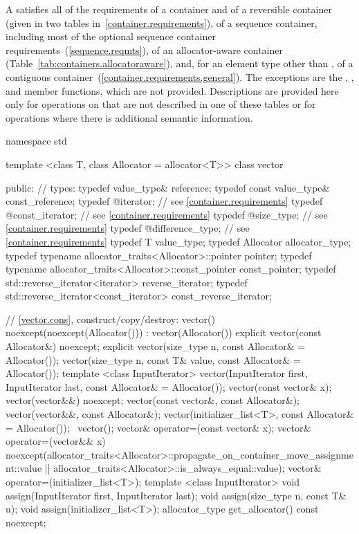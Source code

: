 \pnum
A  satisfies all of the requirements of a container and of a
reversible container (given in two tables in~\ref{container.requirements}), of a
sequence container, including most of the optional sequence container
requirements~(\ref{sequence.reqmts}), of an allocator-aware container
(Table~\ref{tab:containers.allocatoraware}),
and, for an element type other than ,
of a contiguous container~(\ref{container.requirements.general}).
The exceptions are the
, , and  member functions, which are not
provided. Descriptions are provided here only for operations on 
that are not described in one of these tables or for operations where there is
additional semantic information.

\begin{codeblock}
namespace std {
  template <class T, class Allocator = allocator<T>>
  class vector {
  public:
    // types:
    typedef value_type&                                         reference;
    typedef const value_type&                                   const_reference;
    typedef @\impdefnc@                              iterator;        // see \ref{container.requirements}
    typedef @\impdefnc@                              const_iterator;  // see \ref{container.requirements}
    typedef @\impdefnc@                              size_type;       // see \ref{container.requirements}
    typedef @\impdefnc@                              difference_type; // see \ref{container.requirements}
    typedef T                                                   value_type;
    typedef Allocator                                           allocator_type;
    typedef typename allocator_traits<Allocator>::pointer       pointer;
    typedef typename allocator_traits<Allocator>::const_pointer const_pointer;
    typedef std::reverse_iterator<iterator>                     reverse_iterator;
    typedef std::reverse_iterator<const_iterator>               const_reverse_iterator;

    // \ref{vector.cons}, construct/copy/destroy:
    vector() noexcept(noexcept(Allocator())) : vector(Allocator()) { }
    explicit vector(const Allocator&) noexcept;
    explicit vector(size_type n, const Allocator& = Allocator());
    vector(size_type n, const T& value, const Allocator& = Allocator());
    template <class InputIterator>
      vector(InputIterator first, InputIterator last, const Allocator& = Allocator());
    vector(const vector& x);
    vector(vector&&) noexcept;
    vector(const vector&, const Allocator&);
    vector(vector&&, const Allocator&);
    vector(initializer_list<T>, const Allocator& = Allocator());
    ~vector();
    vector& operator=(const vector& x);
    vector& operator=(vector&& x)
      noexcept(allocator_traits<Allocator>::propagate_on_container_move_assignment::value ||
               allocator_traits<Allocator>::is_always_equal::value);
    vector& operator=(initializer_list<T>);
    template <class InputIterator>
      void assign(InputIterator first, InputIterator last);
    void assign(size_type n, const T& u);
    void assign(initializer_list<T>);
    allocator_type get_allocator() const noexcept;

}}
\end{codeblock}
